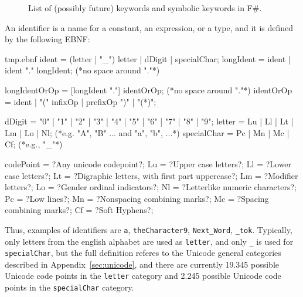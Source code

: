 \begin{figure}
  \caption{List of (possibly future) keywords and symbolic keywords in F\#.}
  \label{fig:keywords}
\end{figure}
An identifier is a name for a constant, an expression, or a type, and it is defined by the following EBNF:
%
\begin{verbatimwrite}{tmp.ebnf}
ident = (letter | "_") {letter | dDigit | specialChar};
longIdent = ident | ident "." longIdent; (*no space around "."*)

longIdentOrOp = [longIdent "."] identOrOp; (*no space around "."*)
identOrOp = 
  ident
  | "(" infixOp | prefixOp ")" 
  | "(*)";

dDigit = "0" | "1" | "2" | "3" | "4" | "5" | "6" | "7" | "8" | "9";
letter = Lu | Ll | Lt | Lm | Lo | Nl; (*e.g. "A", "B" ... and "a", "b", ...*)
specialChar = Pc | Mn | Mc | Cf; (*e.g., "_"*)

codePoint = ?Any unicode codepoint?;
Lu = ?Upper case letters?;
Ll = ?Lower case letters?;
Lt = ?Digraphic letters, with first part uppercase?;
Lm = ?Modifier letters?;
Lo = ?Gender ordinal indicators?;
Nl = ?Letterlike numeric characters?;
Pc = ?Low lines?;
Mn = ?Nonspacing combining marks?;
Mc = ?Spacing combining marks?;
Cf = ?Soft Hyphens?;
\end{verbatimwrite}
%
Thus, examples of identifiers are \lstinline{a}, \lstinline{theCharacter9}, \lstinline{Next_Word}, \lstinline{_tok}. Typically, only letters from the english alphabet are used as \lstinline[language=ebnf]!letter!, and only \lstinline[language=ebnf]!_! is used for \lstinline[language=ebnf]!specialChar!, but the full definition referes to the Unicode general categories described in Appendix~\ref{sec:unicode}, and there are currently 19.345 possible Unicode code points in the \lstinline[language=ebnf]{letter} category and 2.245 possible Unicode code points in the \lstinline[language=ebnf]{specialChar} category.

